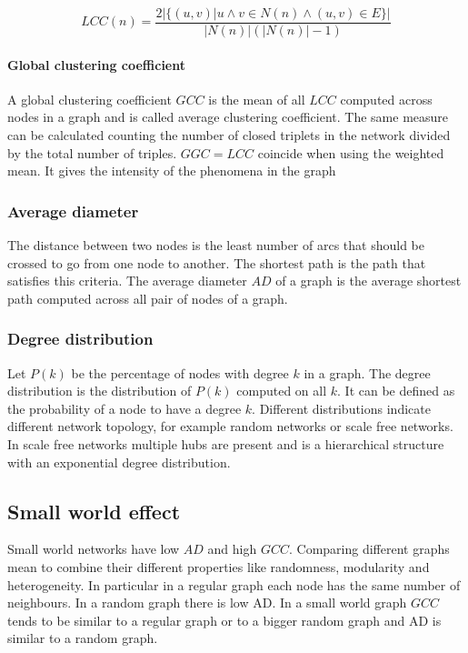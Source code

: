 			$$LCC(n) = \frac{2|\{(u,v)|u\land v\in N(n)\land (u,v)\in E\}|}{|N(n)|(|N(n)|-1)}$$

			\paragraph{Global clustering coefficient}
			A global clustering coefficient $GCC$ is the mean of all $LCC$ computed across nodes in a graph and is called average clustering coefficient.
			The same measure can be calculated counting the number of closed triplets in the network divided by the total number of triples.
			$GGC=LCC$ coincide when using the weighted mean.
			It gives the intensity of the phenomena in the graph

		\subsubsection{Average diameter}
		The distance between two nodes is the least number of arcs that should be crossed to go from one node to another.
		The shortest path is the path that satisfies this criteria.
		The average diameter $AD$ of a graph is the average shortest path computed across all pair of nodes of a graph.

		\subsubsection{Degree distribution}
		Let $P(k)$ be the percentage of nodes with degree $k$ in a graph.
		The degree distribution is the distribution of $P(k)$ computed on all $k$.
		It can be defined as the probability of a node to have a degree $k$.
		Different distributions indicate different network topology, for example random networks or scale free networks.
		In scale free networks multiple hubs are present and is a hierarchical structure with an exponential degree distribution.

	\subsection{Small world effect}
	Small world networks have low $AD$ and high $GCC$.
	Comparing different graphs mean to combine their different properties like randomness, modularity and heterogeneity.
	In particular in a regular graph each node has the same number of neighbours.
	In a random graph there is low AD.
	In a small world graph $GCC$ tends to be similar to a regular graph or to a bigger random graph and AD is similar to a random graph.
